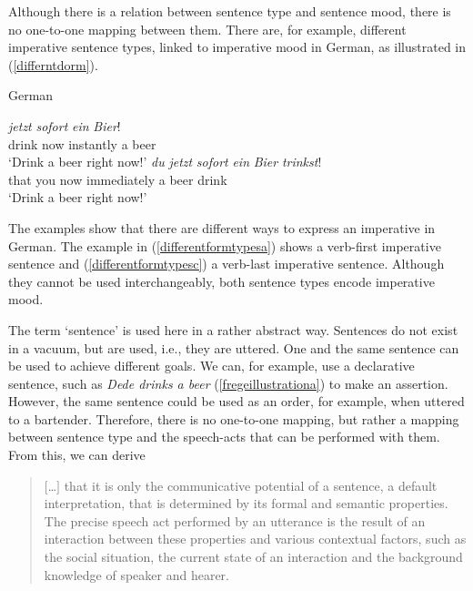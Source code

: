 Although there is a relation between sentence type and sentence mood, there is no one-to-one mapping between them. There are, for example, different imperative sentence types, linked to imperative mood in German, as illustrated in (\ref{differntdorm}).


\begin{exe}
\ex German \label{differntdorm}\begin{xlist} 
\ex {} {\textit{jetzt}} {\textit{sofort}} {\textit{ein}} {\textit{Bier}!}  \\
{drink} {now} {instantly} {a} {beer} \\
\trans `Drink a beer right now!' \label{differentformtypesa}
\ex {} {\textit{du}} {\textit{jetzt}} {\textit{sofort}} {\textit{ein}} {\textit{Bier}} {\textit{trinkst}!}\\
{that} {you} {now} {immediately} {a} {beer} {drink} \\
\trans `Drink a beer right now!' \label{differentformtypesc}
\end{xlist}
\end{exe} 

\noindent The examples show that there are different ways to express an imperative in German. The example in (\ref{differentformtypesa}) shows a verb-first imperative sentence and (\ref{differentformtypesc}) a verb-last imperative sentence. Although they cannot be used interchangeably, both sentence types encode imperative mood.

The term `sentence' is used here in a rather abstract way. Sentences do not exist in a vacuum, but are used, i.e., they are uttered. One and the same sentence can be used to achieve different goals. We can, for example, use a declarative sentence, such as \textit{Dede drinks a beer} (\ref{fregeillustrationa}) to make an assertion. However, the same sentence could be used as an order, for example, when uttered to a bartender. Therefore, there is no one-to-one mapping, but rather a mapping between sentence type and the speech-acts that can be performed with them. From this, we can derive 

\begin{quote}
$[$\dots $]$ that it is only the communicative potential of a sentence, a default interpretation, that is determined by its formal and semantic properties. The precise speech act performed by an utterance is the result of an interaction between these properties and various contextual factors, such as the social situation, the current state of an interaction and the background knowledge of speaker and hearer. \citep[277]{konig2007speech}
\end{quote} 

